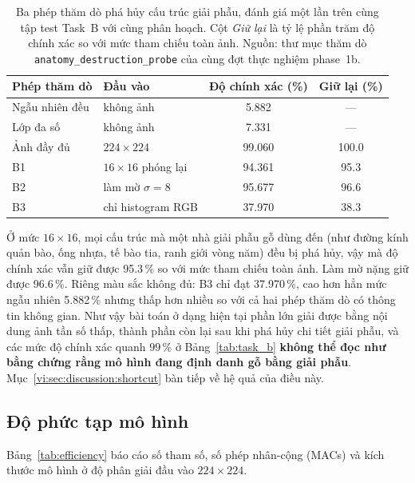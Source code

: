\begin{table}[htbp]
\centering
\small
\caption{Ba phép thăm dò phá hủy cấu trúc giải phẫu, đánh giá một lần trên
cùng tập test Task~B với cùng phân hoạch. Cột \emph{Giữ lại} là tỷ lệ phần
trăm độ chính xác so với mức tham chiếu toàn ảnh. Nguồn: thư mục thăm dò
\texttt{anatomy\_destruction\_probe} của cùng đợt thực nghiệm phase~1b.}
\label{tab:probe}
\begin{tabular}{llcc}
\toprule
\textbf{Phép thăm dò} & \textbf{Đầu vào} & \textbf{Độ chính xác (\%)} & \textbf{Giữ lại (\%)} \\
\midrule
Ngẫu nhiên đều     & không ảnh                & 5.882  & --- \\
Lớp đa số          & không ảnh                & 7.331  & --- \\
Ảnh đầy đủ         & $224\times224$           & 99.060 & 100.0 \\
B1                 & $16\times16$ phóng lại    & 94.361 & 95.3 \\
B2                 & làm mờ $\sigma=8$        & 95.677 & 96.6 \\
B3                 & chỉ histogram RGB        & 37.970 & 38.3 \\
\bottomrule
\end{tabular}
\end{table}

Ở mức $16\times16$, mọi cấu trúc mà một nhà giải phẫu gỗ dùng đến (như đường
kính quản bào, ống nhựa, tế bào tia, ranh giới vòng năm) đều bị phá hủy,
vậy mà độ chính xác vẫn giữ được 95.3\,\% so với mức tham chiếu toàn ảnh. Làm
mờ nặng giữ được 96.6\,\%. Riêng màu sắc không đủ: B3 chỉ đạt 37.970\,\%, cao
hơn hẳn mức ngẫu nhiên 5.882\,\% nhưng thấp hơn nhiều so với cả hai phép thăm
dò có thông tin không gian. Như vậy bài toán ở dạng hiện tại phần lớn giải
được bằng nội dung ảnh tần số thấp, thành phần còn lại sau khi phá hủy chi tiết
giải phẫu, và các mức độ chính xác quanh $99$\,\% ở Bảng~\ref{tab:task_b}
\textbf{không thể đọc như bằng chứng rằng mô hình đang định danh gỗ bằng giải
phẫu}. Mục~\ref{vi:sec:discussion:shortcut} bàn tiếp về hệ quả của điều này.

\subsection{Độ phức tạp mô hình}
\label{vi:sec:results:efficiency}

Bảng~\ref{tab:efficiency} báo cáo số tham số, số phép nhân-cộng (MACs) và kích
thước mô hình ở độ phân giải đầu vào $224\times224$.

